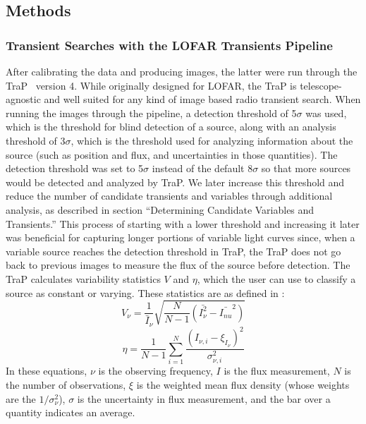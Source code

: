 \documentclass[12pt]{article}
\begin{document}
\subsection{Methods}

\subsubsection{Transient Searches with the LOFAR Transients Pipeline}

After calibrating the data and producing images, the latter were run through the TraP~\citep{2015A&C....11...25S} version 4. While originally designed for LOFAR, the TraP is telescope-agnostic and well suited for any kind of image based radio transient search. When running the images through the pipeline, a detection threshold of 5$\sigma$ was used, which is the threshold for blind detection of a source, along with an analysis threshold of $3\sigma$, which is the threshold used for analyzing information about the source (such as position and flux, and uncertainties in those quantities). The detection threshold was set to 5$\sigma$ instead of the default 8$\sigma$ so that more sources would be detected and analyzed by TraP. We later increase this threshold and reduce the number of candidate transients and variables through additional analysis, as described in section ``Determining Candidate Variables and Transients.'' This process of starting with a lower threshold and increasing it later was beneficial for capturing longer portions of variable light curves since, when a variable source reaches the detection threshold in TraP, the TraP does not go back to previous images to measure the flux of the source before detection. The TraP calculates variability statistics $V$ and $\eta$, which the user can use to classify a source as constant or varying. These statistics are as defined in \citet{2015A&C....11...25S}:
\begin{equation}\label{Veqn}
    V_{\nu} = \frac{1}{\bar{I}_{\nu}}\sqrt{\frac{N}{N-1} (\bar{I_{\nu}^2} - \bar{I_{nu}}^2)}
\end{equation}
\begin{equation}\label{etaeqn}
    \eta =  \frac{1}{N-1} \sum_{i=1}^{N} \frac{(I_{\nu,i} - \xi_{I_{\nu}})^2}{\sigma_{\nu,i}^2}   
\end{equation}
In these equations, $\nu$ is the observing frequency, $I$ is the flux measurement, $N$ is the number of observations, $\xi$ is the weighted mean flux density (whose weights are the $1/\sigma_{\nu}^2$), $\sigma$ is the uncertainty in flux measurement, and the bar over a quantity indicates an average. 
\end{document}
